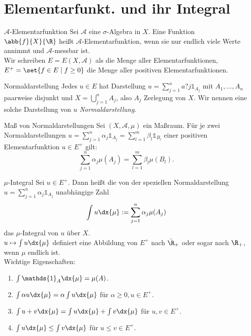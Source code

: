 \section*{Elementarfunkt. und ihr Integral}

\begin{karte}{\( \mathcal{A} \)-Elementarfunktion}
	Sei \( \mathcal{A} \) eine \(\sigma\)-Algebra in \(X\). 
	Eine Funktion \( \abb{f}{X}{\R} \) heißt \(\mathcal{A}\)-Elementarfunktion, 
	wenn sie nur endlich viele Werte annimmt und \(\mathcal{A}\)-messbar ist.\\
	Wir schreiben \( E = E(X, \mathcal{A}) \) als die Menge aller Elementarfunktionen, 
	\( E^+ = \set{ f\in E \;|\; f \geq 0 } \) die Menge aller positiven Elementarfunktionen.
\end{karte}

\begin{karte}{Normaldarstellung}
	Jedes \( u \in E \) hat Darstellung \( u = \sum_{j=1}^n a?j \mathds{1}_{A_j} \) 
	mit \( A_1,\ldots, A_n \) paarweise disjunkt und \( X = \bigcup_{j=1}^n A_j \), also \( A_j \) Zerlegung von \(X\).
	Wir nennen eine solche Darstellung von \(u\) \textit{Normaldarstellung}.
\end{karte}

\begin{karte}{Maß von Normaldarstellungen}
	Sei \( (X, \mathcal{A}, \mu) \) ein Maßraum. Für je zwei Normaldarstellungen 
	\( u = \sum_{j=1}^n \alpha_j \mathds{1}_{A_j} = \sum_{l=1}^m \beta_l \mathds{1}_{B_l} \) einer 
	positiven Elementarfunktion \( u \in E^+ \) gilt: 
	\[ \sum_{j=1}^n \alpha_j \mu(A_j) 
	= \sum_{l=1}^m \beta_l \mu(B_l). \]
\end{karte}

\begin{karte}{\( \mu \)-Integral}
	Sei \( u \in E^+ \). Dann heißt die von der speziellen Normaldarstellung 
	\( u = \sum_{j=1}^n \alpha_j \mathds{1}_{A_j} \) unabhängige 
	Zahl 
	\[ \int u \dx{\mu} 
	:= \sum_{j=1}^n \alpha_j \mu(A_j) \]
	das \( \mu \)-Integral von \(u\) über \(X\).\\
	\( u \mapsto \int u \dx{\mu} \) definiert eine Abbildung von 
	\(E^+\) nach \( \bar{\R}_+ \) oder sogar nach \( \R_+ \), wenn \(\mu\) 
	endlich ist.\\
	Wichtige Eigenschaften:
	\begin{enumerate}
		\item \( \int \mathds{1}_A \dx{\mu} = \mu(A) \).
		\item \( \int \alpha u \dx{\mu} = \alpha \int u \dx{\mu} \) für \( \alpha \geq 0, u \in E^+ \).
		\item \( \int u + v \dx{\mu} = \int u \dx{\mu} + \int v \dx{\mu} \) für \( u,v \in E^+ \).
		\item \( \int u \dx{\mu} \leq \int v \dx{\mu} \) für \( u \leq v \in E^+ \).
	\end{enumerate}
\end{karte}